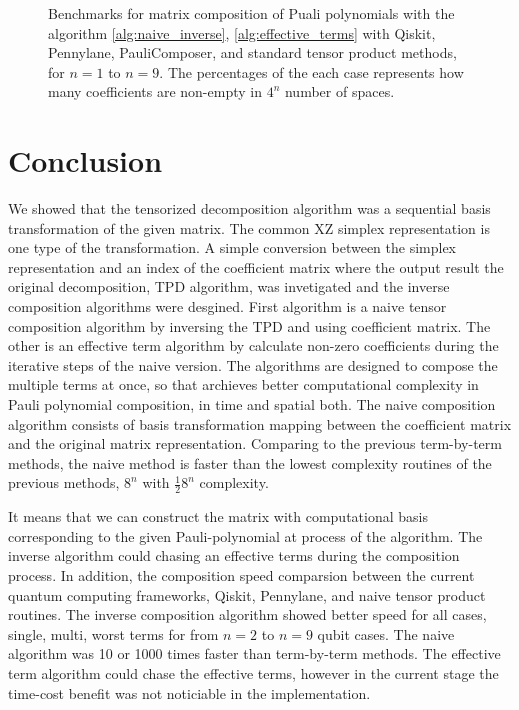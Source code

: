 \documentclass[twocolumn]{article}
\begin{document}
\begin{figure}[ht]
    \caption{Benchmarks for matrix composition of Puali polynomials with the algorithm \ref{alg:naive_inverse}, \ref{alg:effective_terms} with 
    Qiskit, Pennylane, PauliComposer, and standard tensor product methods, for $n=1$ to $n=9$. 
    The percentages of the each case represents how many coefficients are non-empty in $4^n$ number of spaces.}
        \label{fig:results}
\end{figure}

\section{Conclusion}
We showed that the tensorized decomposition algorithm was a 
sequential basis transformation of the given matrix.
The common XZ simplex representation is one type of the transformation.
A simple conversion between the simplex representation and an index of the coefficient matrix 
where the output result the original decomposition, TPD algorithm\cite{hantzko_tensorized_2023}, 
was invetigated and the inverse composition algorithms were desgined. 
First algorithm is a naive tensor composition algorithm by inversing the TPD and using coefficient matrix.
The other is an effective term algorithm by calculate non-zero coefficients during the iterative 
steps of the naive version.
The algorithms are designed to compose the multiple terms at once, 
so that archieves better computational complexity in Pauli polynomial composition, in time and spatial both. 
The naive composition algorithm consists of basis transformation mapping between 
the coefficient matrix and the original matrix representation.
Comparing to the previous term-by-term methods, 
the naive method is faster than the lowest complexity routines of the previous methods, 
$8^n$ with $\frac{1}{2}8^n$ complexity.

It means that we can construct the matrix with computational basis corresponding to the given 
Pauli-polynomial at process of the algorithm. 
The inverse algorithm could chasing an effective terms during the composition process. 
In addition, the composition speed comparsion between the current quantum computing frameworks, Qiskit, Pennylane, and naive
tensor product routines. The inverse composition algorithm showed better speed for all cases, single, multi, worst terms 
for from $n=2$ to $n=9$ qubit cases. The naive algorithm was 10 or 1000 times faster than term-by-term methods.
The effective term algorithm could chase the effective terms, however in the current stage the time-cost benefit 
was not noticiable in the implementation.
\end{document}
